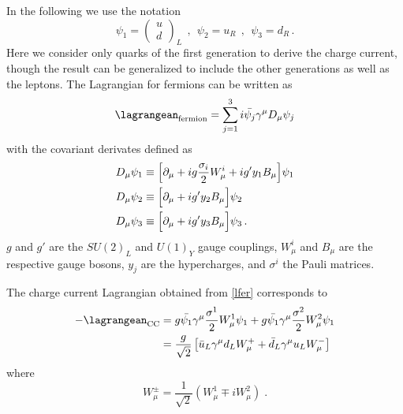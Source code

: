 In the following we use the notation
\begin{equation}
\psi_1=\left(\begin{array}{c}
u \\ d    
\end{array}\right)_{L} \:\:,\:\:
\psi_2=u_R\:\:,\:\:\psi_3=d_{R}\,.
\end{equation}
Here we consider only quarks of the first generation to derive the charge current, though the result can be generalized to include the other generations as well as the leptons. The Lagrangian for fermions can be written as
\begin{equation}
\lagrangean_{\text{fermion}}=\sum_{j=1}^{3} i\bar{\psi_j}\gamma^\mu D_\mu\psi_j
\label{lfer}
\end{equation}
with the covariant derivates defined as
\begin{align*}
D_\mu\psi_1 & \equiv\Bigl[\partial_\mu+ig\frac{\sigma_i}{2}W_\mu^i+ig'y_1B_\mu \Bigr]\psi_1 \\
D_\mu\psi_2 & \equiv\Bigl[\partial_\mu                            +ig'y_2B_\mu \Bigr]\psi_2 \\
D_\mu\psi_3 & \equiv\Bigl[\partial_\mu                            +ig'y_3B_\mu \Bigr]\psi_3 \,.
\end{align*}
$g$ and $g'$ are the $SU(2)_L$ and $U(1)_Y$ gauge couplings, $W_\mu^i$ and $B_\mu$ are the respective gauge bosons, $y_j$ are the hypercharges, and $\sigma^i$ the Pauli matrices. 

The charge current Lagrangian obtained from \ref{lfer} corresponds to
\begin{align}
-\lagrangean_{\text{CC}}&=g\bar{\psi_1}\gamma^\mu \frac{\sigma^1}{2}W_\mu^1\psi_1 + g\bar{\psi_1}\gamma^\mu \frac{\sigma^2}{2}W_\mu^2\psi_1 \notag\\
&= \frac{g}{\sqrt{2}}\left[\bar{u}_L\gamma^\mu d_LW_\mu^{+} + \bar{d}_L\gamma^\mu u_L W_\mu^{-}\right] \label{lcc}
\end{align}
where 
\[
W_\mu^\pm=\frac{1}{\sqrt{2}} (W_\mu^1 \mp iW_\mu^2) \; . 
\]

